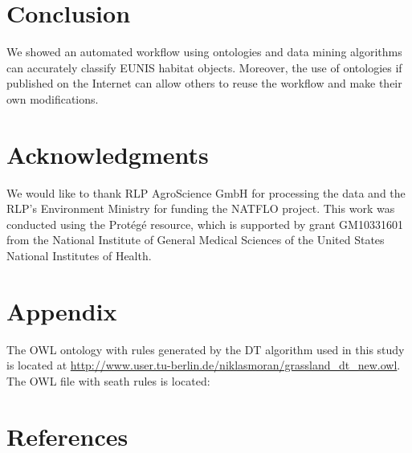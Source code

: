 \documentclass[authoryear, review,12pt,number]{elsarticle}
\begin{document}
\section{Conclusion}
We showed an automated workflow using ontologies and data mining algorithms can 
accurately classify EUNIS habitat objects. Moreover, the use of ontologies if 
published on the Internet can allow others to reuse the workflow and make their 
own modifications. 
\section{Acknowledgments}
We would like to thank RLP AgroScience GmbH for processing the data and the
RLP's Environment Ministry for funding the NATFLO project. This work was
conducted using the Prot\'eg\'e resource, which is supported by grant GM10331601
from the National Institute of General Medical Sciences of the United States
National
Institutes of Health.
\section{Appendix}

The OWL ontology with rules generated by the DT algorithm used in this study 
is located at 
\url{http://www.user.tu-berlin.de/niklasmoran/grassland_dt_new.owl}. The OWL 
file with seath rules is located: 


\section{References}  
\end{document}
